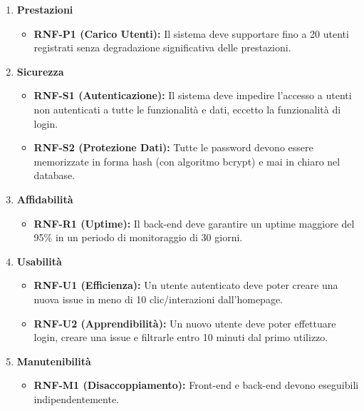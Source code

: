 \documentclass[a4paper,12pt]{article}
\begin{document}
\begin{tcolorbox}[
    enhanced,
    colback=BoxLight,
    colframe=UninaBlue,
    boxrule=0.8pt,
    arc=3pt,
    sharp corners,
    title=Requisiti Non-Funzionali Quantificabili,
    fonttitle=\bfseries\color{UninaBlue},
    coltitle=UninaBlue
]
\begin{enumerate}[label=\textbf{RNF-\arabic*}, leftmargin=*, itemsep=8pt]
    \item \textbf{Prestazioni}
    \begin{itemize}
        \item \textbf{RNF-P1 (Carico Utenti):} Il sistema deve supportare fino a 20 utenti registrati senza degradazione significativa delle prestazioni.
    \end{itemize}
    
    \item \textbf{Sicurezza}
    \begin{itemize}
        \item \textbf{RNF-S1 (Autenticazione):} Il sistema deve impedire l'accesso a utenti non autenticati a tutte le funzionalità e dati, eccetto la funzionalità di login.
        \item \textbf{RNF-S2 (Protezione Dati):} Tutte le password devono essere memorizzate in forma hash (con algoritmo bcrypt) e mai in chiaro nel database.
    \end{itemize}
    
    \item \textbf{Affidabilità}
    \begin{itemize}
        \item \textbf{RNF-R1 (Uptime):} Il back-end deve garantire un uptime maggiore del 95\% in un periodo di monitoraggio di 30 giorni.
    \end{itemize}
    
    \item \textbf{Usabilità}
    \begin{itemize}
        \item \textbf{RNF-U1 (Efficienza):} Un utente autenticato deve poter creare una nuova issue in meno di 10 clic/interazioni dall'homepage.
        \item \textbf{RNF-U2 (Apprendibilità):} Un nuovo utente deve poter effettuare login, creare una issue e filtrarle entro 10 minuti dal primo utilizzo.
    \end{itemize}
    
    \item \textbf{Manutenibilità}
    \begin{itemize}
        \item \textbf{RNF-M1 (Disaccoppiamento):} Front-end e back-end devono eseguibili indipendentemente.
    \end{itemize}
    

\end{enumerate}
\end{tcolorbox}
\end{document}
